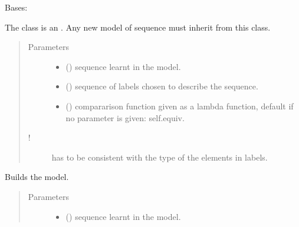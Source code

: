 \documentclass[letterpaper,10pt,english]{sphinxmanual}
\begin{document}

\begin{fulllineitems}
\label{\detokenize{index:Model.Model}}
Bases: 

The class {\hyperref[\detokenize{index:Model.Model}]{}} is an . 
Any new model of sequence must inherit from this class.
\begin{quote}\begin{description}
\item[{Parameters}] \leavevmode\begin{itemize}
\item {} 
 () \textendash{} sequence learnt in the model.

\item {} 
 () \textendash{} sequence of labels chosen to describe the sequence.

\item {} 
 () \textendash{} compararison function given as a lambda function, default if no parameter is given: self.equiv.

\end{itemize}

\item[{!}] \leavevmode
{} has to be consistent with the type of the elements in labels.

\end{description}\end{quote}

\begin{fulllineitems}
\label{\detokenize{index:Model.Model.build}}
Builds the model.
\begin{quote}\begin{description}
\item[{Parameters}] \leavevmode\begin{itemize}
\item {} 
 () \textendash{} sequence learnt in the model.


\end{itemize}
\end{description}
\end{quote}
\end{fulllineitems}
\end{fulllineitems}
\end{document}
